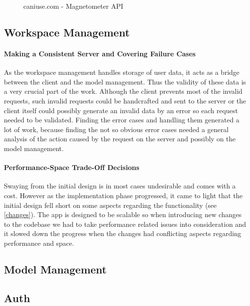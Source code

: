 \begin{figure}[ht]
    \centering
    \caption{caniuse.com - Magnetometer API}
\end{figure}

\subsection{Workspace Management}
\paragraph{Making a Consistent Server and Covering Failure Cases}
As the workspace management handles storage of user data, it acts as a bridge between the client and the model management. Thus the validity of these data is a very crucial part of the work. Although the client prevents most of the invalid requests, such invalid requests could be handcrafted and sent to the server or the client itself could possibly generate an invalid data by an error so each request needed to be validated. Finding the error cases and handling them generated a lot of work, because finding the not so obvious error cases needed a general analysis of the action caused by the request on the server and possibly on the model management.
\paragraph{Performance-Space Trade-Off Decisions}
Swaying from the initial design is in most cases undesirable and comes with a cost. However as the implementation phase progressed, it came to light that the initial design fell short on some aspects regarding the functionality (see \ref{changes}). The app is designed to be scalable so when introducing new changes to the codebase we had to take performance related issues into consideration and it slowed down the progress when the changes had conflicting aspects regarding performance and space.
\subsection{Model Management}
\subsection{Auth}
